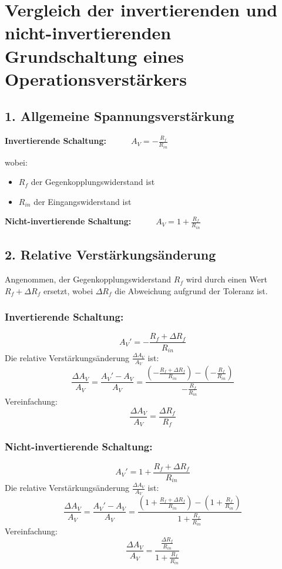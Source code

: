\documentclass[a4paper,12pt]{article}
\begin{document}
\section*{Vergleich der invertierenden und nicht-invertierenden Grundschaltung eines Operationsverstärkers}

\subsection*{1. Allgemeine Spannungsverstärkung}
\textbf{Invertierende Schaltung:}~~~~~~\(A_V = -\frac{R_f}{R_{in}}\)

\noindent wobei:
\begin{itemize}
    \item \( R_f \) der Gegenkopplungswiderstand ist
    \item \( R_{in} \) der Eingangswiderstand ist
\end{itemize}

\noindent \textbf{Nicht-invertierende Schaltung:}~~~~~~\(A_V = 1 + \frac{R_f}{R_{in}}\)


\subsection*{2. Relative Verstärkungsänderung}
Angenommen, der Gegenkopplungswiderstand \( R_f \) wird durch einen Wert \( R_f + \Delta R_f \) ersetzt, wobei \( \Delta R_f \) die Abweichung aufgrund der Toleranz ist.
\subsubsection*{Invertierende Schaltung:}
\[
A_V' = -\frac{R_f + \Delta R_f}{R_{in}}
\]
Die relative Verstärkungsänderung \( \frac{\Delta A_V}{A_V} \) ist:
\[
\frac{\Delta A_V}{A_V} = \frac{A_V' - A_V}{A_V} = \frac{\left( -\frac{R_f + \Delta R_f}{R_{in}} \right) - \left( -\frac{R_f}{R_{in}} \right)}{-\frac{R_f}{R_{in}}}
\]
Vereinfachung:
\[
\frac{\Delta A_V}{A_V} = \frac{\Delta R_f}{R_f}
\]

\subsubsection*{Nicht-invertierende Schaltung:}
\[
A_V' = 1 + \frac{R_f + \Delta R_f}{R_{in}}
\]
Die relative Verstärkungsänderung \( \frac{\Delta A_V}{A_V} \) ist:
\[
\frac{\Delta A_V}{A_V} = \frac{A_V' - A_V}{A_V} = \frac{\left( 1 + \frac{R_f + \Delta R_f}{R_{in}} \right) - \left( 1 + \frac{R_f}{R_{in}} \right)}{1 + \frac{R_f}{R_{in}}}
\]
Vereinfachung:
\[
\frac{\Delta A_V}{A_V} = \frac{\frac{\Delta R_f}{R_{in}}}{1 + \frac{R_f}{R_{in}}}
\]
\end{document}
